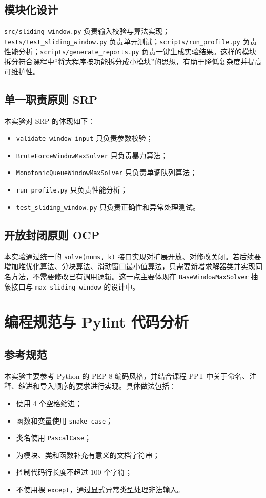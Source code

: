 \documentclass[UTF8,a4paper,12pt]{ctexart}
\begin{document}
\subsection{模块化设计}
\texttt{src/sliding\_window.py} 负责输入校验与算法实现；\texttt{tests/test\_sliding\_window.py} 负责单元测试；\texttt{scripts/run\_profile.py} 负责性能分析；\texttt{scripts/generate\_reports.py} 负责一键生成实验结果。这样的模块拆分符合课程中“将大程序按功能拆分成小模块”的思想，有助于降低复杂度并提高可维护性。

\subsection{单一职责原则 SRP}
本实验对 SRP 的体现如下：
\begin{itemize}
    \item \texttt{validate\_window\_input} 只负责参数校验；
    \item \texttt{BruteForceWindowMaxSolver} 只负责暴力算法；
    \item \texttt{MonotonicQueueWindowMaxSolver} 只负责单调队列算法；
    \item \texttt{run\_profile.py} 只负责性能分析；
    \item \texttt{test\_sliding\_window.py} 只负责正确性和异常处理测试。
\end{itemize}

\subsection{开放封闭原则 OCP}
本实验通过统一的 \texttt{solve(nums, k)} 接口实现对扩展开放、对修改关闭。若后续要增加堆优化算法、分块算法、滑动窗口最小值算法，只需要新增求解器类并实现同名方法，不需要修改已有调用逻辑。这一点主要体现在 \texttt{BaseWindowMaxSolver} 抽象接口与 \texttt{max\_sliding\_window} 的设计中。

\section{编程规范与 Pylint 代码分析}
\subsection{参考规范}
本实验主要参考 Python 的 PEP 8 编码风格，并结合课程 PPT 中关于命名、注释、缩进和导入顺序的要求进行实现。具体做法包括：
\begin{itemize}
    \item 使用 4 个空格缩进；
    \item 函数和变量使用 \texttt{snake\_case}；
    \item 类名使用 \texttt{PascalCase}；
    \item 为模块、类和函数补充有意义的文档字符串；
    \item 控制代码行长度不超过 100 个字符；
    \item 不使用裸 \texttt{except}，通过显式异常类型处理非法输入。
\end{itemize}
\end{document}
